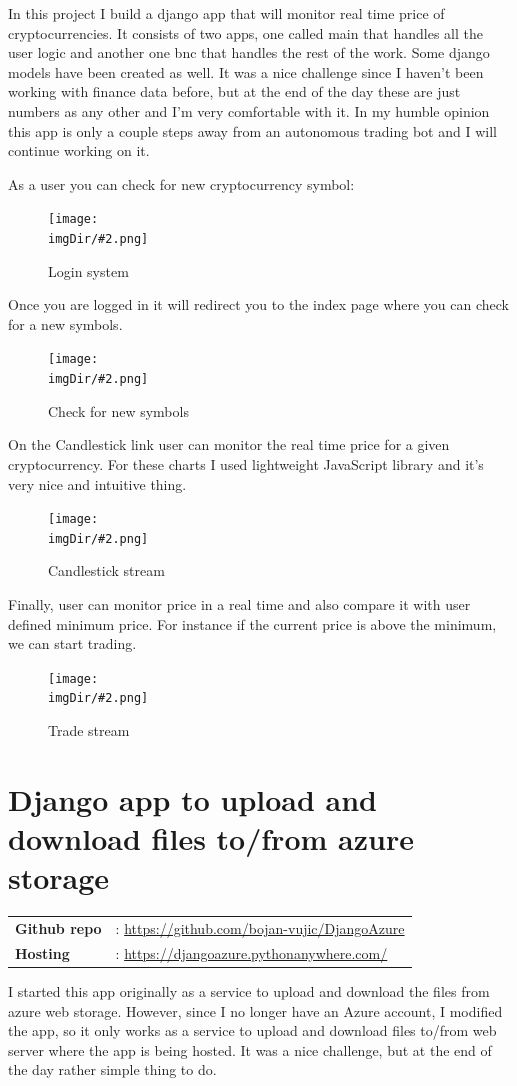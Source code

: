 \documentclass[11pt, onecolumn]{article}
\newcommand{\demo}[2]{%
	\vspace{3mm}
	\begin{tabular}{ll}
		\textbf{Github repo} & : \color{blue}#1\vspace{1mm}\\
		\vspace{2mm}\textbf{Hosting} & : \color{blue}#2 \\
	\end{tabular}
	\vspace{3mm}
}
\newcommand{\fig}[3]{%
	\vspace{-2mm}
	\begin{figure}[H]
		\centering
		\texttt{[image: \\imgDir/\#2.png]}
		\vspace{-3mm}
		\caption[]{#3}
		\label{fig:#2}
	\end{figure}
	\vspace{-2mm}
}
\begin{document}
\begin{multicols}{2}
In this project I build a django app that will monitor real time price of cryptocurrencies. It consists of two apps, one called main that handles all the user logic and another one bnc that handles the rest of the work. Some django models have been created as well.
It was a nice challenge since I haven't been working with finance data before, but at the end of the day these are just numbers as any other and I'm very comfortable with it. In my humble opinion this app is only a couple steps away from an autonomous trading bot and I will continue working on it.

As a user you can check for new cryptocurrency symbol:

\fig{70mm}{img-2}{Login system}

Once you are logged in it will redirect you to the index page where you can check for a new symbols.

\fig{80mm}{img-3}{Check for new symbols}

On the Candlestick link user can monitor the real time price for a given cryptocurrency. For these charts I used lightweight JavaScript library and it's very nice and intuitive thing.

\fig{80mm}{img-4}{Candlestick stream}

Finally, user can monitor price in a real time and also compare it with user defined minimum price. For instance if the current price is above the minimum, we can start trading.

\fig{80mm}{img-5}{Trade stream}

\end{multicols}


\pagebreak
\section{Django app to upload and download files to/from azure storage}
\def\imgDir{azure}
\demo{\url{https://github.com/bojan-vujic/DjangoAzure}}{\url{https://djangoazure.pythonanywhere.com/}}

I started this app originally as a service to upload and download the files from azure web storage. However, since I no longer have an Azure account, I modified the app, so it only works as a service to upload and download files to/from web server where the app is being hosted. It was a nice challenge, but at the end of the day rather simple thing to do.
\end{document}
